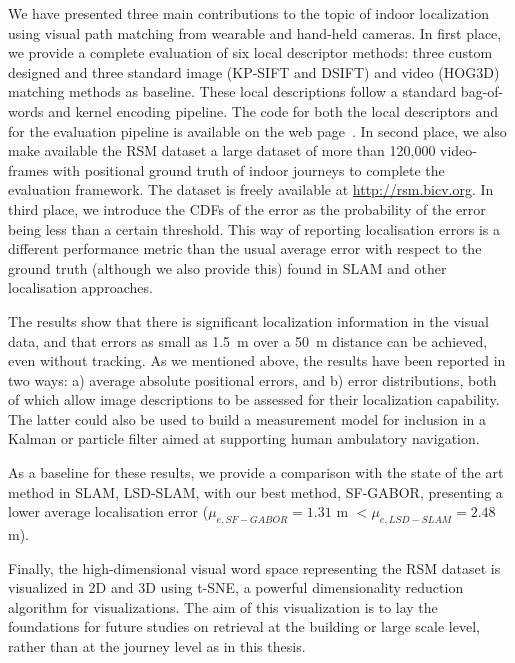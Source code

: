 We have presented three main contributions to the topic of indoor localization using visual path matching from wearable and hand-held cameras. In first place, we provide a complete evaluation of six local descriptor methods: three custom designed and three standard image (KP-SIFT and DSIFT) and video (HOG3D) matching methods as baseline. These local descriptions follow a standard bag-of-words and kernel encoding pipeline. The code for both the local descriptors and for the evaluation pipeline is available on the web page~\cite{Rivera-Rubio2014_LFVP_code}. In second place, we also make available the RSM dataset a large dataset of more than 120,000 video-frames with positional ground truth of indoor journeys to complete the evaluation framework. The dataset is freely available at \url{http://rsm.bicv.org}. In third place, we introduce the CDFs of the error as the probability of the error being less than a certain threshold. This way of reporting localisation errors is a different performance metric than the usual average error with respect to the ground truth (although we also provide this) found in SLAM and other localisation approaches.

The results show that there is significant localization information in the visual data, and that errors as small as \SI{1.5}{m} over a \SI{50}{m} distance can be achieved, even without tracking. As we mentioned above, the results have been reported in two ways: a) average absolute positional errors, and b) error distributions, both of which allow image descriptions to be assessed for their localization capability.  The latter could also be used to build a measurement model for inclusion in a Kalman or particle filter  aimed at supporting human ambulatory navigation. 

As a baseline for these results, we provide a comparison with the state of the art method in SLAM, LSD-SLAM, with our best method, SF-GABOR, presenting a lower average localisation error ($\mu_{e,SF-GABOR} = 1.31 $ m $< \mu_{e,LSD-SLAM} = 2.48 $ m).

Finally, the high-dimensional visual word space representing the RSM dataset is visualized in 2D and 3D using t-SNE, a powerful dimensionality reduction algorithm for visualizations. The aim of this visualization is to lay the foundations for future studies on retrieval at the building or large scale level, rather than at the journey level as in this thesis.

